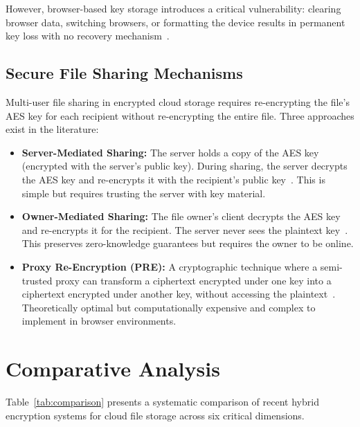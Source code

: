 \documentclass[conference]{IEEEtran}
\begin{document}
However, browser-based key storage introduces a critical vulnerability: clearing browser data, switching browsers, or formatting the device results in permanent key loss with no recovery mechanism~\cite{patil2024client}.

\subsection{Secure File Sharing Mechanisms}

Multi-user file sharing in encrypted cloud storage requires re-encrypting the file's AES key for each recipient without re-encrypting the entire file. Three approaches exist in the literature:

\begin{itemize}
    \item \textbf{Server-Mediated Sharing:} The server holds a copy of the AES key (encrypted with the server's public key). During sharing, the server decrypts the AES key and re-encrypts it with the recipient's public key~\cite{hassan2023enhanced}. This is simple but requires trusting the server with key material.
    \item \textbf{Owner-Mediated Sharing:} The file owner's client decrypts the AES key and re-encrypts it for the recipient. The server never sees the plaintext key~\cite{patil2024client}. This preserves zero-knowledge guarantees but requires the owner to be online.
    \item \textbf{Proxy Re-Encryption (PRE):} A cryptographic technique where a semi-trusted proxy can transform a ciphertext encrypted under one key into a ciphertext encrypted under another key, without accessing the plaintext~\cite{ateniese2006improved}. Theoretically optimal but computationally expensive and complex to implement in browser environments.
\end{itemize}

\section{Comparative Analysis}

Table~\ref{tab:comparison} presents a systematic comparison of recent hybrid encryption systems for cloud file storage across six critical dimensions.
\end{document}
